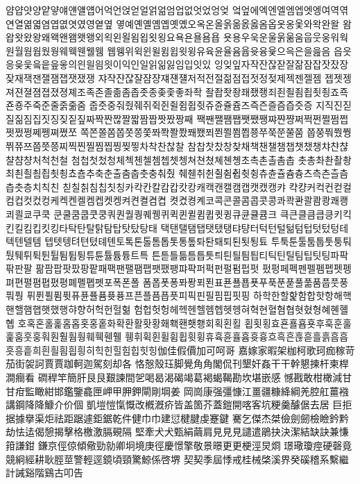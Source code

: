 얌얍얏양얕얗얘얜얠얩어억언얹얻얼얽얾엄업없엇었엉엊
엌엎에엑엔엘엠엡엣엥여역엮연열엶엷염엽엾엿였영옅옆
옇예옌옐옘옙옛옜오옥온올옭옮옰옳옴옵옷옹옻와왁완왈
왐왑왓왔왕왜왝왠왬왯왱외왹왼욀욈욉욋욍요욕욘욜욤욥
욧용우욱운울욹욺움웁웃웅워웍원월웜웝웠웡웨웩웬웰웸
웹웽위윅윈윌윔윕윗윙유육윤율윰윱윳융윷으윽은을읊음
읍읏응읒읓읔읕읖읗의읜읠읨읫이익인일읽읾잃임입잇있
잉잊잎자작잔잖잗잘잚잠잡잣잤장잦재잭잰잴잼잽잿쟀쟁
쟈쟉쟌쟎쟐쟘쟝쟤쟨쟬저적전절젊점접젓정젖제젝젠젤젬
젭젯젱져젼졀졈졉졌졍졔조족존졸졺좀좁좃종좆좇좋좌좍
좔좝좟좡좨좼좽죄죈죌죔죕죗죙죠죡죤죵주죽준줄줅줆줌
줍줏중줘줬줴쥐쥑쥔쥘쥠쥡쥣쥬쥰쥴쥼즈즉즌즐즘즙즛증
지직진짇질짊짐집짓징짖짙짚짜짝짠짢짤짧짬짭짯짰짱째
짹짼쨀쨈쨉쨋쨌쨍쨔쨘쨩쩌쩍쩐쩔쩜쩝쩟쩠쩡쩨쩽쪄쪘쪼
쪽쫀쫄쫌쫍쫏쫑쫓쫘쫙쫠쫬쫴쬈쬐쬔쬘쬠쬡쭁쭈쭉쭌쭐쭘
쭙쭝쭤쭸쭹쮜쮸쯔쯤쯧쯩찌찍찐찔찜찝찡찢찧차착찬찮찰
참찹찻찼창찾채책챈챌챔챕챗챘챙챠챤챦챨챰챵처척천철
첨첩첫첬청체첵첸첼쳄쳅쳇쳉쳐쳔쳤쳬쳰촁초촉촌촐촘촙
촛총촤촨촬촹최쵠쵤쵬쵭쵯쵱쵸춈추축춘출춤춥춧충춰췄
췌췐취췬췰췸췹췻췽츄츈츌츔츙츠측츤츨츰츱츳층치칙친
칟칠칡침칩칫칭카칵칸칼캄캅캇캉캐캑캔캘캠캡캣캤캥캬
캭컁커컥컨컫컬컴컵컷컸컹케켁켄켈켐켑켓켕켜켠켤켬켭
켯켰켱켸코콕콘콜콤콥콧콩콰콱콴콸쾀쾅쾌쾡쾨쾰쿄쿠쿡
쿤쿨쿰쿱쿳쿵쿼퀀퀄퀑퀘퀭퀴퀵퀸퀼큄큅큇큉큐큔큘큠크
큭큰클큼큽킁키킥킨킬킴킵킷킹타탁탄탈탉탐탑탓탔탕태
택탠탤탬탭탯탰탱탸턍터턱턴털턺텀텁텃텄텅테텍텐텔템
텝텟텡텨텬텼톄톈토톡톤톨톰톱톳통톺톼퇀퇘퇴퇸툇툉툐
투툭툰툴툼툽툿퉁퉈퉜퉤튀튁튄튈튐튑튕튜튠튤튬튱트특
튼튿틀틂틈틉틋틔틘틜틤틥티틱틴틸팀팁팃팅파팍팎판팔
팖팜팝팟팠팡팥패팩팬팰팸팹팻팼팽퍄퍅퍼퍽펀펄펌펍펏
펐펑페펙펜펠펨펩펫펭펴편펼폄폅폈평폐폘폡폣포폭폰폴
폼폽폿퐁퐈퐝푀푄표푠푤푭푯푸푹푼푿풀풂품풉풋풍풔풩
퓌퓐퓔퓜퓟퓨퓬퓰퓸퓻퓽프픈플픔픕픗피픽핀필핌핍핏핑
하학한할핥함합핫항해핵핸핼햄햅햇했행햐향허헉헌헐헒
험헙헛헝헤헥헨헬헴헵헷헹혀혁현혈혐협혓혔형혜혠혤혭
호혹혼홀홅홈홉홋홍홑화확환활홧황홰홱홴횃횅회획횐횔
횝횟횡효횬횰횹횻후훅훈훌훑훔훗훙훠훤훨훰훵훼훽휀휄
휑휘휙휜휠휨휩휫휭휴휵휸휼흄흇흉흐흑흔흖흗흘흙흠흡
흣흥흩희흰흴흼흽힁히힉힌힐힘힙힛힝伽佳假價加可呵哥
嘉嫁家暇架枷柯歌珂痂稼苛茄街袈訶賈賈跏軻迦駕刻却各
恪慤殼珏脚覺⾓角閣侃刊墾奸姦⼲干幹懇揀杆柬桿澗癎看
磵稈竿簡肝⾉艮艱諫間乫喝曷渴碣竭葛褐蝎鞨勘坎堪嵌感
憾戡敢柑橄減⽢甘疳監瞰紺邯鑑鑒龕匣岬甲胛鉀閘剛堈姜
岡崗康强彊慷江畺疆糠絳綱羌腔舡薑襁講鋼降降鱇介价個
凱塏愷愾慨改槪漑疥皆盖箇芥蓋鎧開喀客坑粳羹醵倨去居
巨拒据據擧渠炬祛距踞遽鉅鋸乾件健⼱巾建愆楗腱虔蹇鍵
騫乞傑杰桀儉劍劒檢瞼鈐黔劫怯迲偈憩揭擊格檄激膈覡隔
堅牽⽝犬甄絹繭肩⾒見見譴遣鵑抉決潔結缺訣兼慊箝謙鉗
鎌京俓倞傾儆勁勍卿坰境庚徑慶憬擎敬景暻更更梗涇炅烱
璟璥瓊痙硬磬竟競絅經耕耿脛莖警輕逕鏡頃頸驚鯨係啓堺
契契季屆悸戒桂械棨溪界癸磎稽系繫繼計誡谿階鷄古叩告
